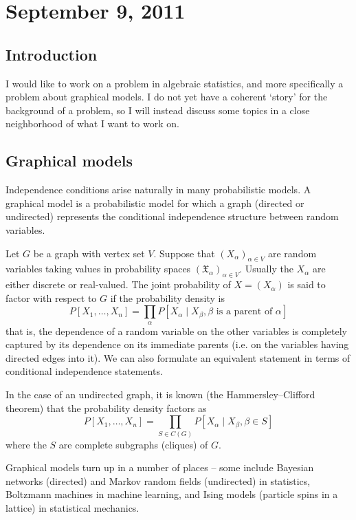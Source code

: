 \documentclass[11pt]{article}
\newcommand*{\X}{\mathfrak{X}}
\begin{document}
\section{September 9, 2011}

\subsection{Introduction}

I would like to work on a problem in algebraic statistics, and more specifically
a problem about graphical models.  I do not yet have a coherent `story' for the
background of a problem, so I will instead discuss some topics in a close
neighborhood of what I want to work on.


\subsection{Graphical models}

Independence conditions arise naturally in many probabilistic models.  A
graphical model is a probabilistic model for which a graph (directed or
undirected) represents the conditional independence structure between random
variables. 

Let $G$ be a graph with vertex set $V$.  Suppose that $(X_\alpha)_{\alpha \in
V}$ are random variables taking values in probability spaces
$(\X_\alpha)_{\alpha \in V}$.  Usually the $X_\alpha$ are either discrete or
real-valued.  The joint probability of $X = (X_\alpha)$ is said to
factor with respect to $G$ if the probability density is
\[
    P[X_1, \ldots, X_n] = 
        \prod_\alpha P[X_\alpha \mid X_\beta, \beta \text{ is a parent of }
        \alpha]
\]
that is, the dependence of a random variable on the other variables is
completely captured by its dependence on its immediate parents (i.e. on the
variables having directed edges into it).  We can also formulate an equivalent
statement in terms of conditional independence statements.

In the case of an undirected graph, it is known (the Hammersley–Clifford
theorem) that the probability density factors as
\[
    P[X_1, \ldots, X_n] = 
        \prod_{S \in C(G)} P[X_\alpha \mid X_\beta, \beta \in S]
\]
where the $S$ are complete subgraphs (cliques) of $G$.

Graphical models turn up in a number of places -- some include Bayesian networks
(directed) and Markov random fields (undirected) in statistics, Boltzmann
machines in machine learning, and Ising models (particle spins in a lattice) in
statistical mechanics.
\end{document}
